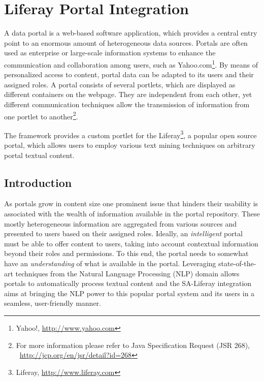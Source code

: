 %
%
%   
% 

\chapter{Liferay Portal Integration}
\label{chap:liferay}
A data portal is a web-based software application, which provides a central entry point to an enormous amount of heterogeneous data sources. Portals are often used as enterprise or large-scale information systems to enhance the communication and collaboration among users, such as Yahoo.com\footnote{Yahoo!, \url{http://www.yahoo.com}}. By means of personalized access to content, portal data can be adapted to its users and their assigned roles. A portal consists of several portlets, which are displayed as different containers on the webpage. They are independent from each other, yet different communication techniques allow the transmission of information from one portlet to another\footnote{For more information please refer to Java Specification Request (JSR 268), ~\url{http://jcp.org/en/jsr/detail?id=268}}.

The \sa framework provides a custom portlet for the Liferay\footnote{Liferay, \url{http://www.liferay.com}}, a popular open source portal, which allows users to employ various text mining techniques on arbitrary portal textual content.

\section{Introduction}
As portals grow in content size one prominent issue that hinders their usability is associated with the wealth of information available in the portal repository. These mostly heterogeneous information are aggregated from various sources and presented to users based on their assigned roles. Ideally, an \emph{intelligent} portal must be able to offer content to users, taking into account contextual information beyond their roles and permissions. To this end, the portal needs to somewhat have an \emph{understanding} of what is available in the portal. Leveraging state-of-the-art techniques from the Natural Language Processing (NLP) domain allows portals to automatically process textual content and the SA-Liferay integration aims at bringing the NLP power to this popular portal system and its users in a seamless, user-friendly manner.

